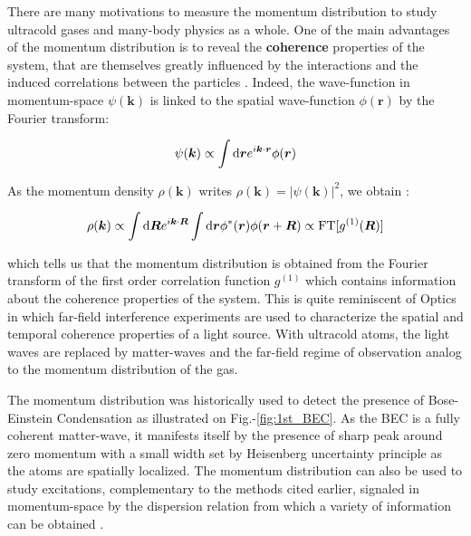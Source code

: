 
There are many motivations to measure the momentum distribution to study ultracold gases and many-body physics as a whole. One of the main advantages of the momentum distribution is to reveal the \textbf{coherence} properties of the system, that are themselves greatly influenced by the interactions and the induced correlations between the particles \cite{greiner2002quantum}. Indeed, the wave-function in momentum-space $\psi(\bm{k})$ is linked to the spatial wave-function $\phi(\bm{r})$ by the Fourier transform:

\begin{equation}
    \psi(\bm{k}) \propto \int {\rm d}\bm{r} e^{i \bm{k} \cdot \bm{r}} \phi(\bm{r})
\end{equation}

\noindent As the momentum density $\rho(\bm{k})$ writes $\rho(\bm{k})= |\psi(\bm{k})|^2$, we obtain \cite{pitaevskii2016bose}:

\begin{equation}
    \rho(\bm{k}) \propto \int {\rm d}\bm{R} e^{i \bm{k} \cdot \bm{R}} \int {\rm d}\bm{r} \phi^* (\bm{r}) \phi(\bm{r}+\bm{R}) \propto \text{FT} [g^{(1)} (\bm{R})]
\end{equation}

\noindent which tells us that the momentum distribution is obtained from the Fourier transform of the first order correlation function $g^{(1)}$ which contains information about the coherence properties of the system.
This is quite reminiscent of Optics in which far-field interference experiments are used to characterize the spatial and temporal coherence properties of a light source. With ultracold atoms, the light waves are replaced by matter-waves and the far-field regime of observation analog to the momentum distribution of the gas.

The momentum distribution was historically \cite{anderson1995observation} used to detect the presence of Bose-Einstein Condensation as illustrated on Fig.-\ref{fig:1st_BEC}. As the BEC is a fully coherent matter-wave, it manifests itself by the presence of sharp peak around zero momentum with a small width set by Heisenberg uncertainty principle as the atoms are spatially localized. The momentum distribution can also be used to study excitations, complementary to the methods cited earlier, signaled in momentum-space by the dispersion relation from which a variety of information can be obtained \cite{clement2009exploring,ozeri2005colloquium,sagi2012measurement}.


